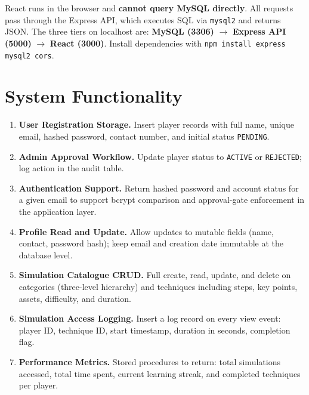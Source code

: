 \documentclass[12pt,a4paper]{article}
\begin{document}
React runs in the browser and \textbf{cannot query MySQL directly}. All requests
pass through the Express API, which executes SQL via \texttt{mysql2} and returns
JSON. The three tiers on localhost are:
\textbf{MySQL (3306)} $\to$ \textbf{Express API (5000)} $\to$ \textbf{React (3000)}.
Install dependencies with \texttt{npm install express mysql2 cors}.

\section{System Functionality}

\begin{enumerate}[leftmargin=1.5em, itemsep=4pt]

    \item \textbf{User Registration Storage.}
    Insert player records with full name, unique email, hashed password,
    contact number, and initial status \texttt{PENDING}.

    \item \textbf{Admin Approval Workflow.}
    Update player status to \texttt{ACTIVE} or \texttt{REJECTED}; log
    action in the audit table.

    \item \textbf{Authentication Support.}
    Return hashed password and account status for a given email to support
    bcrypt comparison and approval-gate enforcement in the application layer.

    \item \textbf{Profile Read and Update.}
    Allow updates to mutable fields (name, contact, password hash); keep
    email and creation date immutable at the database level.

    \item \textbf{Simulation Catalogue CRUD.}
    Full create, read, update, and delete on categories (three-level
    hierarchy) and techniques including steps, key points, assets,
    difficulty, and duration.

    \item \textbf{Simulation Access Logging.}
    Insert a log record on every view event: player ID, technique ID,
    start timestamp, duration in seconds, completion flag.

    \item \textbf{Performance Metrics.}
    Stored procedures to return: total simulations accessed, total time
    spent, current learning streak, and completed techniques per player.


\end{enumerate}
\end{document}
